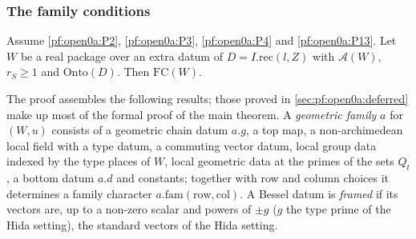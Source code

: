 \subsubsection{The family conditions}

\begin{proposition}\label{pf:open0a:famall}
Assume \ref{pf:open0a:P2}, \ref{pf:open0a:P3}, \ref{pf:open0a:P4} and \ref{pf:open0a:P13}. Let $W$ be a real package
over an extra datum of $D=I.\mathrm{rec}(l,Z)$ with $\mathcal A(W)$, $r_S\ge1$ and $\mathrm{Onto}(D)$. Then
$\mathrm{FC}(W)$.
\ 
\end{proposition}

The proof assembles the following results; those proved in \cref{sec:pf:open0a:deferred} make up most of the formal
proof of the main theorem. A \emph{geometric family} $a$ for $(W,u)$ consists of a
geometric chain datum $a.g$, a top map, a non-archimedean local field with a type datum, a commuting vector datum, local
group data indexed by the type places of $W$, local geometric data at the primes of the sets $Q_t$, a bottom datum
$a.d$ and constants; together with row and column choices it determines a family character
$a.\mathrm{fam}(\mathrm{row},\mathrm{col})$. A Bessel datum is \emph{framed} if its vectors are, up to a non-zero
scalar and powers of $\pm g$ ($g$ the type prime of the Hida setting), the standard vectors of the Hida setting.

